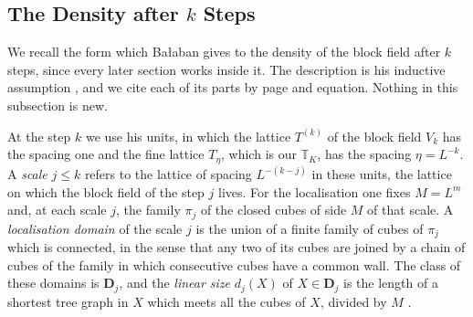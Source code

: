\documentclass[11pt]{preprint}
\numberwithin{equation}{section}
\theoremstyle{definition}
\theoremstyle{remark}
\theoremstyle{plain}
\begin{document}
\subsection{The Density after \texorpdfstring{$k$}{k} Steps}\label{sec:density}

We recall the form which Ba{\l}aban gives to the density of the block field after $k$ steps, since every later section works inside it. The description is his inductive assumption \cite[Sect.~2]{BalabanCRE}, and we cite each of its parts by page and equation. Nothing in this subsection is new.

At the step $k$ we use his units, in which the lattice $T^{(k)}$ of the block field $V_k$ has the spacing one and the fine lattice $T_\eta$, which is our $\mathbb T_K$, has the spacing $\eta = L^{-k}$. A \emph{scale} $j \leq k$ refers to the lattice of spacing $L^{-(k-j)}$ in these units, the lattice on which the block field of the step $j$ lives. For the localisation one fixes $M = L^m$ and, at each scale $j$, the family $\pi_j$ of the closed cubes of side $M$ of that scale. A \emph{localisation domain} of the scale $j$ is the union of a finite family of cubes of $\pi_j$ which is connected, in the sense that any two of its cubes are joined by a chain of cubes of the family in which consecutive cubes have a common wall. The class of these domains is $\mathbf D_j$, and the \emph{linear size} $d_j(X)$ of $X \in \mathbf D_j$ is the length of a shortest tree graph in $X$ which meets all the cubes of $X$, divided by $M$ \cite[p.~257]{BalabanRG1}.
\end{document}
